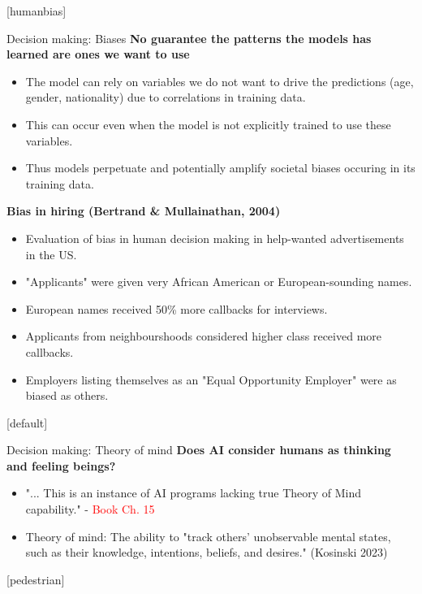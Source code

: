 \documentclass[8pt]{beamer}
\begin{document}
	[humanbias]

	\begin{frame}[t]{Decision making: Biases} %
		\textbf{No guarantee the patterns the models has learned are ones we want to use}
		\begin{itemize}
			\item The model can rely on variables we do not want to drive the predictions (age, gender, nationality) due to correlations in training data.
			\item This can occur even when the model is not explicitly trained to use these variables.
			\item Thus models perpetuate and potentially amplify societal biases occuring in its training data.
		\end{itemize}
		\textbf{Bias in hiring (Bertrand \& Mullainathan, 2004)}
		\begin{itemize}
			\item Evaluation of bias in human decision making in help-wanted advertisements in the US.
			\item "Applicants" were given very African American or European-sounding names.
			\item European names received 50\% more callbacks for interviews.
			\item Applicants from neighbourshoods considered higher class received more callbacks.
			\item Employers listing themselves as an "Equal Opportunity Employer" were as biased as others.
		\end{itemize}
	\end{frame}

	[default]

	\begin{frame}[t]{Decision making: Theory of mind}
		\textbf{Does AI consider humans as thinking and feeling beings?}
		\begin{itemize}
			\item "... This is an instance of AI programs lacking true Theory of Mind capability." - \textcolor{red}{Book Ch. 15}
			\item Theory of mind: The ability to "track others' unobservable mental states, such as their knowledge, intentions, beliefs, and desires." (Kosinski 2023)
		\end{itemize}
	\end{frame}

	[pedestrian]
\end{document}
